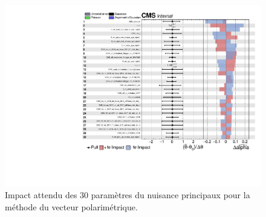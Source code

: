 \begin{figure}[]
        \centering
        \includegraphics[scale=0.6]{Chapitre7/Images/impactspvblind.pdf} 
        \vspace{0.5ex}
    \caption{Impact attendu des 30 paramètres du nuisance principaux pour la méthode du vecteur polarimétrique.}
    \label{expectednuisancedp}
\end{figure}

